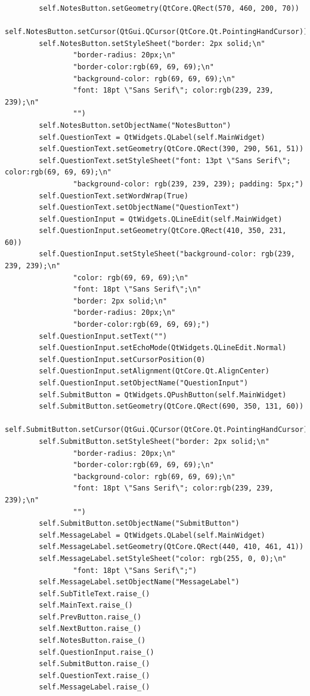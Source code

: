 \documentclass{article}
\begin{document}
\begin{lstlisting}
        self.NotesButton.setGeometry(QtCore.QRect(570, 460, 200, 70))
        self.NotesButton.setCursor(QtGui.QCursor(QtCore.Qt.PointingHandCursor))
        self.NotesButton.setStyleSheet("border: 2px solid;\n"
                "border-radius: 20px;\n"
                "border-color:rgb(69, 69, 69);\n"
                "background-color: rgb(69, 69, 69);\n"
                "font: 18pt \"Sans Serif\"; color:rgb(239, 239, 239);\n"
                "")
        self.NotesButton.setObjectName("NotesButton")
        self.QuestionText = QtWidgets.QLabel(self.MainWidget)
        self.QuestionText.setGeometry(QtCore.QRect(390, 290, 561, 51))
        self.QuestionText.setStyleSheet("font: 13pt \"Sans Serif\"; color:rgb(69, 69, 69);\n"
                "background-color: rgb(239, 239, 239); padding: 5px;")
        self.QuestionText.setWordWrap(True)
        self.QuestionText.setObjectName("QuestionText")
        self.QuestionInput = QtWidgets.QLineEdit(self.MainWidget)
        self.QuestionInput.setGeometry(QtCore.QRect(410, 350, 231, 60))
        self.QuestionInput.setStyleSheet("background-color: rgb(239, 239, 239);\n"
                "color: rgb(69, 69, 69);\n"
                "font: 18pt \"Sans Serif\";\n"
                "border: 2px solid;\n"
                "border-radius: 20px;\n"
                "border-color:rgb(69, 69, 69);")
        self.QuestionInput.setText("")
        self.QuestionInput.setEchoMode(QtWidgets.QLineEdit.Normal)
        self.QuestionInput.setCursorPosition(0)
        self.QuestionInput.setAlignment(QtCore.Qt.AlignCenter)
        self.QuestionInput.setObjectName("QuestionInput")
        self.SubmitButton = QtWidgets.QPushButton(self.MainWidget)
        self.SubmitButton.setGeometry(QtCore.QRect(690, 350, 131, 60))
        self.SubmitButton.setCursor(QtGui.QCursor(QtCore.Qt.PointingHandCursor))
        self.SubmitButton.setStyleSheet("border: 2px solid;\n"
                "border-radius: 20px;\n"
                "border-color:rgb(69, 69, 69);\n"
                "background-color: rgb(69, 69, 69);\n"
                "font: 18pt \"Sans Serif\"; color:rgb(239, 239, 239);\n"
                "")
        self.SubmitButton.setObjectName("SubmitButton")
        self.MessageLabel = QtWidgets.QLabel(self.MainWidget)
        self.MessageLabel.setGeometry(QtCore.QRect(440, 410, 461, 41))
        self.MessageLabel.setStyleSheet("color: rgb(255, 0, 0);\n"
                "font: 18pt \"Sans Serif\";")
        self.MessageLabel.setObjectName("MessageLabel")
        self.SubTitleText.raise_()
        self.MainText.raise_()
        self.PrevButton.raise_()
        self.NextButton.raise_()
        self.NotesButton.raise_()
        self.QuestionInput.raise_()
        self.SubmitButton.raise_()
        self.QuestionText.raise_()
        self.MessageLabel.raise_()


\end{lstlisting}
\end{document}
